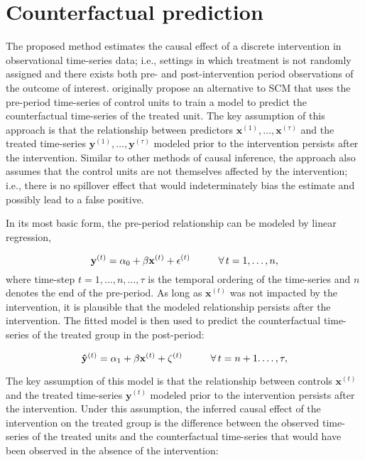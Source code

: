 \documentclass[hidelinks,12pt]{article}
\begin{document}
\section{Counterfactual prediction} \label{prediction}

The proposed method estimates the causal effect of a discrete intervention in observational time-series data; i.e., settings in which treatment is not randomly assigned and there exists both pre- and post-intervention period observations of the outcome of interest. \citet{brodersen2015inferring} originally propose an alternative to SCM that uses the pre-period time-series of control units to train a model to predict the counterfactual time-series of the treated unit. The key assumption of this approach is that the relationship between predictors $\mathbf{x}^{(1)}, \ldots, \mathbf{x}^{(\tau)}$ and the treated time-series $\mathbf{y}^{(1)}, \ldots, \mathbf{y}^{(\tau)}$ modeled prior to the intervention persists after the intervention. Similar to other methods of causal inference, the approach also assumes that the control units are not themselves affected by the intervention; i.e., there is no spillover effect that would indeterminately bias the estimate and possibly lead to a false positive. 

In its most basic form, the pre-period relationship can be modeled by linear regression, 

\begin{equation}
  \mathbf{y}^{(t)} =  \alpha_0 + \beta \mathbf{x}^{(t)} + \epsilon^{(t)} \hspace{10mm} \forall \, t = 1, \ldots, n, 
\end{equation}
\noindent
where time-step $t = 1, \ldots, n, \ldots, \tau$ is the temporal ordering of the time-series and $n$ denotes the end of the pre-period. As long as $\mathbf{x}^{(t)}$ was not impacted by the intervention, it is plausible that the modeled relationship persists after the intervention. The fitted model is then used to predict the counterfactual time-series of the treated group in the post-period: 

\begin{equation}
  \mathbf{\hat{y}}^{(t)} =  \alpha_1 + \beta \mathbf{x}^{(t)} + \zeta^{(t)}  \hspace{10mm} \forall \, t = n+1. \ldots, \tau, 
\end{equation}

The key assumption of this model is that the relationship between controls $\mathbf{x}^{(t)}$ and the treated time-series $\mathbf{y}^{(t)}$ modeled prior to the intervention persists after the intervention. Under this assumption, the inferred causal effect of the intervention on the treated group is the difference between the observed time-series of the treated units and the counterfactual time-series that would have been observed in the absence of the intervention:
\end{document}
